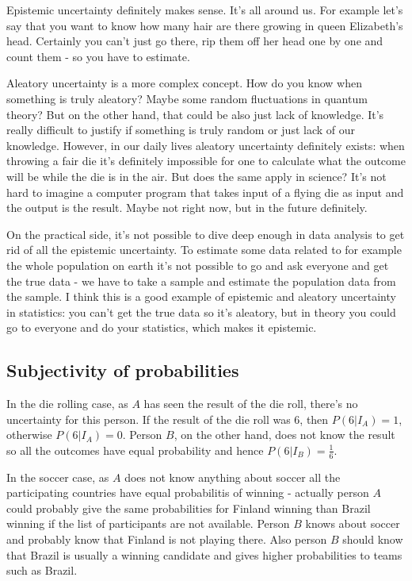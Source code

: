 \documentclass[11pt]{amsart}
\begin{document}
Epistemic uncertainty definitely makes sense. It's all around us. For example let's say that you want to know how many hair are there growing in queen Elizabeth's head. Certainly you can't just go there, rip them off her head one by one and count them - so you have to estimate.

Aleatory uncertainty is a more complex concept. How do you know when something is truly aleatory? Maybe some random fluctuations in quantum theory? But on the other hand, that could be also just lack of knowledge. It's really difficult to justify if something is truly random or just lack of our knowledge. However, in our daily lives aleatory uncertainty definitely exists: when throwing a fair die it's definitely impossible for one to calculate what the outcome will be while the die is in the air. But does the same apply in science? It's not hard to imagine a computer program that takes input of a flying die as input and the output is the result. Maybe not right now, but in the future definitely.

On the practical side, it's not possible to dive deep enough in data analysis to get rid of all the epistemic uncertainty. To estimate some data related to for example the whole population on earth it's not possible to go and ask everyone and get the true data - we have to take a sample and estimate the population data from the sample. I think this is a good example of epistemic and aleatory uncertainty in statistics: you can't get the true data so it's aleatory, but in theory you could go to everyone and do your statistics, which makes it epistemic.

\subsection*{Subjectivity of probabilities}

In the die rolling case, as $A$ has seen the result of the die roll, there's no uncertainty for this person. If the result of the die roll was 6, then $P(6|I_A) = 1$, otherwise $P(6|I_A) = 0$. Person $B$, on the other hand, does not know the result so all the outcomes have equal probability and hence $P(6|I_B) = \frac{1}{6}$.

In the soccer case, as $A$ does not know anything about soccer all the participating countries have equal probabilitis of winning - actually person $A$ could probably give the same probabilities for Finland winning than Brazil winning if the list of participants are not available. Person $B$ knows about soccer and probably know that Finland is not playing there. Also person $B$ should know that Brazil is usually a winning candidate and gives higher probabilities to teams such as Brazil.
\end{document}
